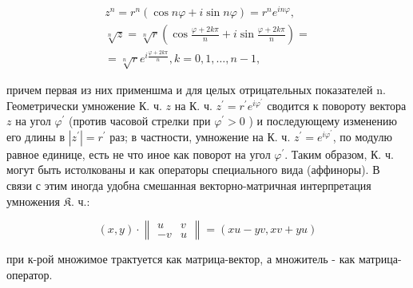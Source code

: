 \documentclass[10pt]{article}
\begin{document}
\[

\begin{gathered}

z^{n}=r^{n}(\cos n \varphi+i \sin n \varphi)=r^{n} e^{i n \varphi}, \\

\sqrt[n]{z}=\sqrt[n]{r}\left(\cos \frac{\varphi+2 k \pi}{n}+i \sin \frac{\varphi+2 k \pi}{n}\right)= \\

=\sqrt[n]{r} e^{i \frac{\varphi+2 k \pi}{n}}, k=0,1, \ldots, n-1,

\end{gathered}

\]



причем первая из них применшма и для целых отрицательных показателей n. Геометрически умножение К. ч. $z$ на К. ч. $z^{\prime}=r^{\prime} e^{i \varphi^{\prime}}$ сводится к повороту вектора $z$ на угол $\varphi^{\prime}$ (против часовой стрелки при $\varphi^{\prime}>0$ ) и последующему изменению его длины в $\left|z^{\prime}\right|=r^{\prime}$ раз; в частности, умножение на К. ч. $z^{\prime}=e^{i \varphi^{\prime}}$, по модулю равное единице, есть не что иное как поворот на угол $\varphi^{\prime}$. Таким образом, К. ч. могут быть истолкованы и как операторы специального вида (аффиноры). В связи с этим иногда удобна смешанная векторно-матричная интерпретация умножения $\mathfrak{K}$. ч.:



\[

(x, y) \cdot\left\|\begin{array}{rr}

u & v \\

-v & u

\end{array}\right\|=(x u-y v, x v+y u)

\]



при к-рой множимое трактуется как матрица-вектор, а множитель - как матрица-оператор.
\end{document}
